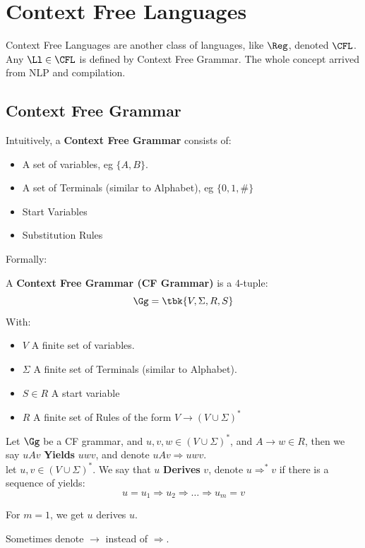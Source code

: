 \chapter{Context Free Languages}
Context Free Languages are another class of languages, like $\Reg$, denoted $\CFL$. Any $\Ll\in \CFL$ is defined by Context Free Grammar. The whole concept arrived from NLP and compilation.
\section{Context Free Grammar}
Intuitively, a \textbf{Context Free Grammar} consists of:
\begin{itemize}
	\item A set of variables, eg $\{A,B\}$.
	\item A set of Terminals (similar to Alphabet), eg $\{0,1,\#\}$
	\item Start Variables
	\item Substitution Rules
\end{itemize}
Formally:
\begin{yellowBox}
	\begin{defn}
		 A \textbf{Context Free Grammar (CF Grammar)} is a 4-tuple:
		\[
		\Gg = \tbk{V,\Sigma, R, S}
		\]
		With:
		\begin{itemize}
			\item $V$ A finite set of variables.
			\item $\Sigma $ A finite set of Terminals (similar to Alphabet).
			\item $S\in R$ A start variable
			\item $R$ A finite set of Rules of the form $V\to (V\cup \Sigma)^*$
		\end{itemize}
	\end{defn}
\end{yellowBox}
\begin{yellowBox}
	\begin{defn}
		 Let $\Gg$ be a CF grammar, and $u,v,w\in (V\cup\Sigma)^*$, and $A\to w\in R$, then we say $uAv$ \textbf{Yields} $uwv$, and denote $uAv\Rightarrow uwv$.\\
		let $u,v\in (V\cup\Sigma)^*$. We say that $u$ \textbf{Derives} $v$, denote $u\Rightarrow^*v$ if there is a sequence of yields:
		\[
		u = u_1\Rightarrow u_2 \Rightarrow \ldots \Rightarrow u_m = v
		\]
	\end{defn}
	\begin{remark}
		For $m=1$, we get $u$ derives $u$.
	\end{remark}
	\begin{remark}
		Sometimes denote $\to$ instead of $\Rightarrow$.
	\end{remark}
\end{yellowBox}

